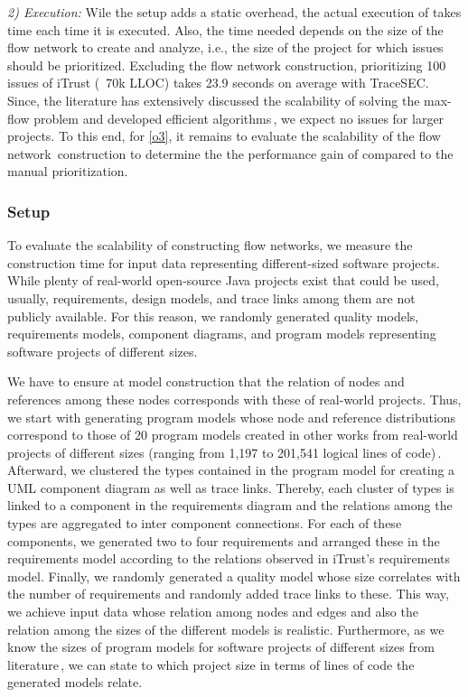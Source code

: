 	\textit{2) Execution:}
	Wile the setup adds a static overhead, the actual execution of \appr{} takes time each time it is executed.
	Also, the time needed depends on the size of the flow network to create and analyze, i.e., the size of the project for which issues should be prioritized.
	Excluding the flow network construction, prioritizing 100 issues of iTrust (~70k LLOC) takes 23.9 seconds on average with TraceSEC.
	Since, the literature has extensively discussed the scalability of solving the max-flow problem and developed efficient algorithms\,\cite{ford_fulkerson_1956,dinic1970algorithm}, we expect no issues for larger projects.
To this end, for \ref{o3}, it remains to evaluate the scalability of the flow network~construction to determine the the performance gain of \appr{} compared to the manual prioritization.

\subsubsection{Setup}
%
To evaluate the scalability of constructing  flow networks, we measure the construction time for input data representing different-sized software projects. While plenty of real-world open-source Java projects exist that could be used, usually, requirements, design models, and trace links among them are not publicly available. For this reason, we randomly generated quality models, requirements models, component diagrams, and program models representing software projects of different sizes.

We have to ensure at model construction that the relation of nodes and references among these nodes corresponds with these of real-world projects.
Thus, we start with generating program models whose node and reference distributions correspond to those of 20 program models created in other works from real-world projects of different sizes (ranging from 1,197 to 201,541 logical lines of code)\,\cite{peldszus2016continuous,Peldszus2022}.
Afterward, we clustered the types contained in the program model for creating a UML component diagram as well as trace links.
Thereby, each cluster of types is linked to a component in the requirements diagram and the relations among the types are aggregated to inter component connections.
For each of these components, we generated two to four requirements and arranged these in the requirements model according to the relations observed in iTrust's requirements model.
Finally, we randomly generated a quality model whose size correlates with the number of requirements and randomly added trace links to these.
This way, we achieve input data whose relation among nodes and edges and also the relation among the sizes of the different models is realistic.
Furthermore, as we know the sizes of program models for software projects of different sizes from literature\,\cite{peldszus2016continuous}, we can state to which project size in terms of lines of code the generated models relate.

